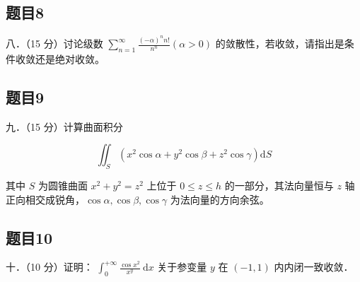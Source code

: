 \documentclass{article}
\begin{document}
\subsection{题目8}
八．（15 分）讨论级数 \(\sum_{n=1}^{\infty} \frac{(-\alpha)^{n} n!}{n^{n}}(\alpha>0)\) 的敛散性，若收敛，请指出是条件收敛还是绝对收敛。

\subsection{题目9}
九．（15 分）计算曲面积分

\[
\iint_{S}\left(x^{2} \cos \alpha+y^{2} \cos \beta+z^{2} \cos \gamma\right) \mathrm{d} S
\]

其中 \(S\) 为圆锥曲面 \(x^{2}+y^{2}=z^{2}\) 上位于 \(0 \leq z \leq h\) 的一部分，其法向量恒与 \(z\) 轴正向相交成锐角，\(\cos \alpha, \cos \beta, \cos \gamma\) 为法向量的方向余弦。

\subsection{题目10}
十．（10 分）证明： \(\int_{0}^{+\infty} \frac{\cos x^{2}}{x^{y}} \mathrm{~d} x\) 关于参变量 \(y\) 在 \((-1,1)\) 内内闭一致收敛．
\end{document}
